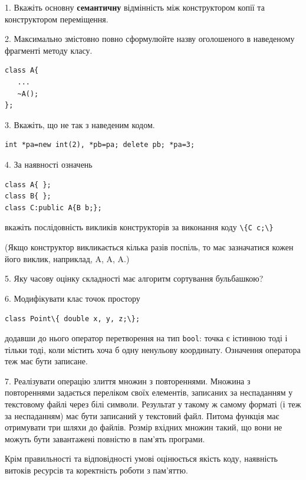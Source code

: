 \documentclass[12pt, ukrainian]{article}
\def\code#1{\Verb!#1!}
\begin{document}
{%
1. Вкажіть основну \textbf{семантичну} відмінність між конструктором копії та конструктором переміщення.%
\par
\vspace{2mm}
2. Максимально змістовно повно сформулюйте назву оголошеного в наведеному фрагменті методу класу.
\vspace{-3mm}
\begin{verbatim}class A{
   ...
   ~A();
};\end{verbatim}
\vspace{-3mm}
\par
\vspace{2mm}
3. Вкажіть, що не так з наведеним кодом.
\vspace{-3mm}
\begin{verbatim}int *pa=new int(2), *pb=pa; delete pb; *pa=3;\end{verbatim}
\vspace{-3mm}
\par
\vspace{2mm}
4. За наявності означень
\vspace{-3mm}
\begin{verbatim}
class A{ };
class B{ };
class C:public A{B b;};\end{verbatim}
\vspace{-3mm}
вкажіть послідовність викликів конструкторів за виконання коду \code{\{C c;\}} 

(Якщо конструктор викликається кілька разів поспіль, то має зазначатися кожен його виклик, наприклад, A, A, A.)

\vspace{2mm}
5. Яку часову оцінку складності має алгоритм сортування бульбашкою?
\par
\vspace{2mm}
6. Модифікувати клас точок простору 

\qquad\code{class Point\{ double x, y, z;\};}


додавши до нього оператор перетворення на тип \code{bool}: точка є істинною тоді і тільки тоді, коли містить хоча б одну ненульову координату. Означення оператора теж має бути записане.%
\par
\vspace{2mm}
7. 
Реалізувати операцію злиття множин з повтореннями. Множина з повтореннями задається переліком своїх елементів, записаних за неспаданням у текстовому файлі через білі символи. Результат у такому ж самому форматі (і теж за неспаданням) має бути записаний у текстовий файл. Питома функція має отримувати три шляхи до файлів. Розмір вхідних множин такий, що вони не можуть бути завантажені повністю в пам’ять програми.

Крім правильності та відповідності умові оцінюється якість коду, наявність витоків ресурсів та коректність роботи з пам'яттю. 

}
\end{document}
